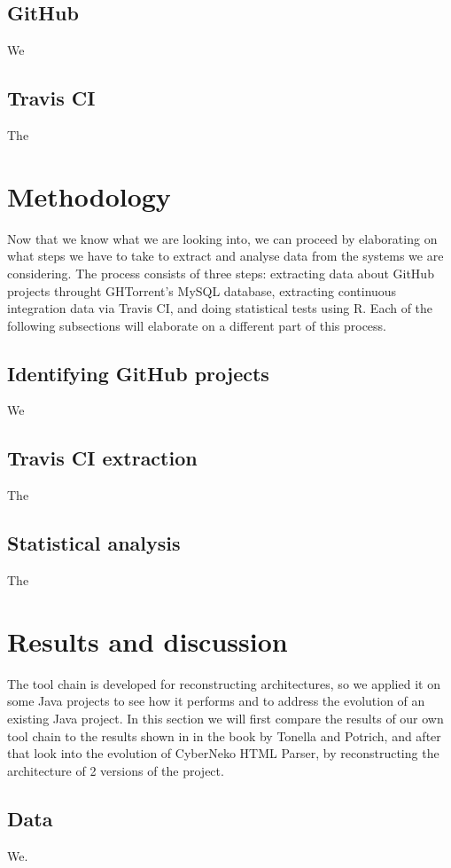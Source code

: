 \documentclass[a4paper,11pt]{article}
\begin{document}
		\subsection{GitHub}
			We
		
		\subsection{Travis CI}
			The 
		
	\section{Methodology}
		Now that we know what we are looking into, we can proceed by elaborating on what steps we have to take to extract and analyse data from the systems we are considering. The process consists of three steps: extracting data about GitHub projects throught GHTorrent's MySQL database, extracting continuous integration data via Travis CI, and doing statistical tests using R. Each of the following subsections will elaborate on a different part of this process.
		
		\subsection{Identifying GitHub projects}
			We
	
		\subsection{Travis CI extraction}
			The 
	
		\subsection{Statistical analysis}
			The  
	
	\section{Results and discussion}
		The tool chain is developed for reconstructing architectures, so we applied it on some Java projects to see how it performs and to address the evolution of an existing Java project. In this section we will first compare the results of our own tool chain to the results shown in in the book by Tonella and Potrich, and after that look into the evolution of CyberNeko HTML Parser, by reconstructing the architecture of 2 versions of the project.
		
		\subsection{Data}
			We.
			
\end{document}
